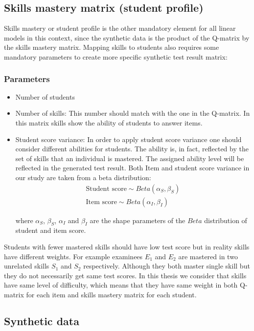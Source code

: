 \subsection{Skills mastery matrix (student profile)}
\label{Student_Profile}
Skills mastery or student profile is the other mandatory element for all linear models in this context, since the synthetic data is the product of the Q-matrix by the skills mastery matrix. Mapping skills to students also requires some mandatory parameters to create more specific synthetic test result matrix:
\subsubsection{Parameters}
\begin{itemize}
\item Number of students 
\item Number of skills: This number should match with the one in the Q-matrix. In this matrix skills show the ability of students to answer items.
\item Student score variance: In order to apply student score variance one should consider different abilities for students. The ability is, in fact, reflected by the set of skills that an individual is mastered. The assigned ability level will be reflected in the generated test result. Both Item and student score variance in our study are taken from a beta distribution:
\begin{eqnarray*}
\textrm{Student score} \sim Beta(\alpha_S, \beta_S)\\
\textrm{Item score} \sim Beta(\alpha_I, \beta_I)
\end{eqnarray*}

where $\alpha_S$, $\beta_S$, $\alpha_I$ and  $\beta_I$ are the shape parameters of the $Beta$ distribution of student and item score.

\end{itemize}

Students with fewer mastered skills should have low test score but in reality skills have different weights. For example examinees $E_1$ and $E_2$ are mastered in two unrelated skills $S_1$ and $S_2$ respectively. Although they both master single skill but they do not necessarily get same test scores. In this thesis we consider that skills have same level of difficulty, which means that they have same weight in both Q-matrix for each item and skills mastery matrix for each student. 


\subsection{Synthetic data}

